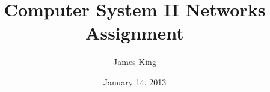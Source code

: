 \documentclass[a4paper]{article}
\title{Computer System II Networks Assignment}
\date{January 14, 2013}
\author{James King}
\begin{document}
	\maketitle
	\lipsum
\end{document}

